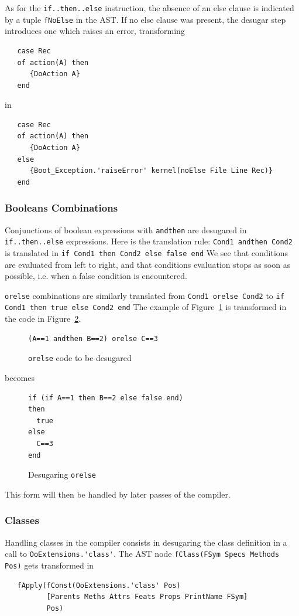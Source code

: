 \documentclass[a4paper]{memoir}
\begin{document}
\pagebreak[4]
As for the \lstinline!if..then..else! instruction, the absence of an else clause
is indicated by a tuple \lstinline!fNoElse! in the AST. If no else clause was
present, the desugar step introduces one which raises an error, transforming

\nopagebreak[4]
\begin{lstlisting}
   case Rec
   of action(A) then
      {DoAction A}
   end
\end{lstlisting}
in
\begin{lstlisting}
   case Rec
   of action(A) then
      {DoAction A}
   else
      {Boot_Exception.'raiseError' kernel(noElse File Line Rec)}
   end
\end{lstlisting}

\subsubsection{Booleans Combinations}
Conjunctions of boolean expressions with \lstinline!andthen! are desugared in
\lstinline!if..then..else! expressions. Here is the translation
rule:
\lstinline!Cond1 andthen Cond2! is translated in \lstinline!if Cond1 then Cond2 else false end! 
We see that conditions are evaluated from left to right, and that conditions
evaluation stops as soon as possible, i.e. when a false condition is
encountered.

\lstinline!orelse! combinations are similarly translated from \lstinline!Cond1 orelse Cond2! to \lstinline!if Cond1 then true else Cond2 end!  
The example of Figure~\ref{fig:desugar:orelsesrc} is transformed in the code in
Figure~\ref{fig:desugar:orelse}.
\begin{figure}[h]
\begin{lstlisting}
(A==1 andthen B==2) orelse C==3
\end{lstlisting}
\caption{\lstinline!orelse! code to be desugared}
\label{fig:desugar:orelsesrc}
\end{figure}

becomes

\begin{figure}[h]
\begin{lstlisting}
if (if A==1 then B==2 else false end)
then
  true
else
  C==3
end
\end{lstlisting}
\caption{Desugaring \lstinline!orelse!}
\label{fig:desugar:orelse}
\end{figure}


This form will then be handled by later passes of the compiler.
\subsubsection{Classes}\label{sec:arch:desugar:classes}
Handling classes in the
compiler consists in desugaring the class definition in a call to
\lstinline!OoExtensions.'class'!. 
The AST node \lstinline!fClass(FSym Specs Methods Pos)! gets transformed in 
\begin{lstlisting}
   fApply(fConst(OoExtensions.'class' Pos) 
          [Parents Meths Attrs Feats Props PrintName FSym] 
          Pos)
\end{lstlisting}
\end{document}
